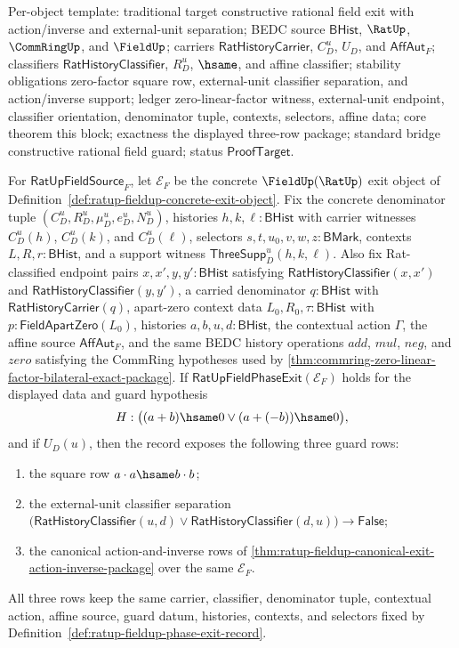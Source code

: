 Per-object template: traditional target constructive rational field exit with
action/inverse and external-unit separation; BEDC source $\mathsf{BHist}$,
$\RatUp$, $\CommRingUp$, and $\FieldUp$; carriers
$\mathsf{RatHistoryCarrier}$, $C_D^u$, $U_D$, and $\mathsf{AffAut}_F$;
classifiers $\mathsf{RatHistoryClassifier}$, $R_D^u$, $\hsame$, and affine
classifier; stability obligations zero-factor square row, external-unit
classifier separation, and action/inverse support; ledger zero-linear-factor
witness, external-unit endpoint, classifier orientation, denominator tuple,
contexts, selectors, affine data; core theorem this block; exactness the
displayed three-row package; standard bridge constructive rational field guard;
status $\mathsf{ProofTarget}$.

\begin{theorem}
\label{thm:ratup-fieldup-phase-exit-record-guard-projection}
For $\mathsf{RatUpFieldSource}_F$, let $\mathcal E_F$ be the concrete
$\FieldUp(\RatUp)$ exit object of
Definition~\ref{def:ratup-fieldup-concrete-exit-object}. Fix the concrete
denominator tuple $(C_D^u,R_D^u,\mu_D^u,e_D^u,N_D^u)$, histories
$h,k,\ell:\mathsf{BHist}$ with carrier witnesses $C_D^u(h)$, $C_D^u(k)$, and
$C_D^u(\ell)$, selectors $s,t,u_0,v,w,z:\mathsf{BMark}$, contexts
$L,R,r:\mathsf{BHist}$, and a support witness
$\mathsf{ThreeSupp}_D^u(h,k,\ell)$. Also fix Rat-classified endpoint pairs
$x,x',y,y':\mathsf{BHist}$ satisfying
$\mathsf{RatHistoryClassifier}(x,x')$ and
$\mathsf{RatHistoryClassifier}(y,y')$, a carried denominator
$q:\mathsf{BHist}$ with $\mathsf{RatHistoryCarrier}(q)$, apart-zero context data
$L_0,R_0,\tau:\mathsf{BHist}$ with $p:\mathsf{FieldApartZero}(L_0)$, histories
$a,b,u,d:\mathsf{BHist}$, the contextual action $\Gamma$, the affine source
$\mathsf{AffAut}_F$, and the same BEDC history operations $add$, $mul$, $neg$,
and $zero$ satisfying the CommRing hypotheses used by
\autoref{thm:commring-zero-linear-factor-bilateral-exact-package}. If
$\mathsf{RatUpFieldPhaseExit}(\mathcal E_F)$ holds for the displayed data and
guard hypothesis
$$
H:\bigl((a+b)\hsame0 \lor (a+(-b))\hsame0\bigr),
$$
and if $U_D(u)$, then the record exposes the following three guard rows:
\begin{enumerate}
  \item the square row $a\cdot a\hsame b\cdot b$;
  \item the external-unit classifier separation
  $\bigl(\mathsf{RatHistoryClassifier}(u,d)\lor
  \mathsf{RatHistoryClassifier}(d,u)\bigr)\to\mathsf{False}$;
  \item the canonical action-and-inverse rows of
  \autoref{thm:ratup-fieldup-canonical-exit-action-inverse-package} over the
  same $\mathcal E_F$.
\end{enumerate}
All three rows keep the same carrier, classifier, denominator tuple, contextual
action, affine source, guard datum, histories, contexts, and selectors fixed by
Definition~\ref{def:ratup-fieldup-phase-exit-record}.
\end{theorem}
